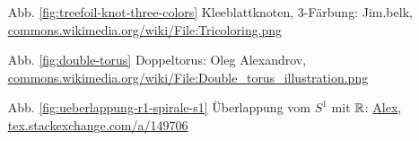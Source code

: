\begin{itemize}
    \item[Abb. \ref{fig:treefoil-knot-three-colors}] Kleeblattknoten, 3-Färbung: Jim.belk, \href{https://commons.wikimedia.org/wiki/File:Tricoloring.png}{commons.wikimedia.org/wiki/File:Tricoloring.png}
    \item[Abb. \ref{fig:double-torus}] Doppeltorus: Oleg Alexandrov, \href{https://commons.wikimedia.org/wiki/File:Double_torus_illustration.png}{commons.wikimedia.org/wiki/File:Double\_torus\_illustration.png}
    \item[Abb. \ref{fig:ueberlappung-r1-spirale-s1}] Überlappung vom $S^1$ mit $\mathbb{R}$: \href{http://tex.stackexchange.com/users/22467/alex}{Alex}, \href{http://tex.stackexchange.com/a/149706/5645}{tex.stackexchange.com/a/149706}
\end{itemize}
